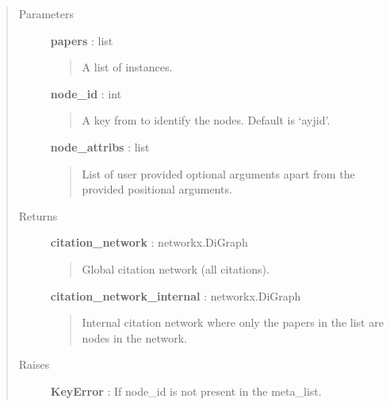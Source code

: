 \documentclass[letterpaper,10pt,english]{sphinxmanual}
\begin{document}
\begin{fulllineitems}
\begin{quote}\begin{description}
\item[{Parameters}] \leavevmode
\textbf{papers} : list
\begin{quote}

A list of {\hyperref[tethne.classes.paper:tethne.classes.paper.Paper]{}} instances.
\end{quote}

\textbf{node\_id} : int
\begin{quote}

A key from {\hyperref[tethne.classes.paper:tethne.classes.paper.Paper]{}} to identify the nodes. Default is `ayjid'.
\end{quote}

\textbf{node\_attribs} : list
\begin{quote}

List of user provided optional arguments apart from the provided
positional arguments.
\end{quote}

\item[{Returns}] \leavevmode
\textbf{citation\_network} : networkx.DiGraph
\begin{quote}

Global citation network (all citations).
\end{quote}

\textbf{citation\_network\_internal} : networkx.DiGraph
\begin{quote}

Internal citation network where only the papers in the list are nodes in
the network.
\end{quote}

\item[{Raises}] \leavevmode
\textbf{KeyError} : If node\_id is not present in the meta\_list.

\end{description}\end{quote}

\end{fulllineitems}

\end{document}
